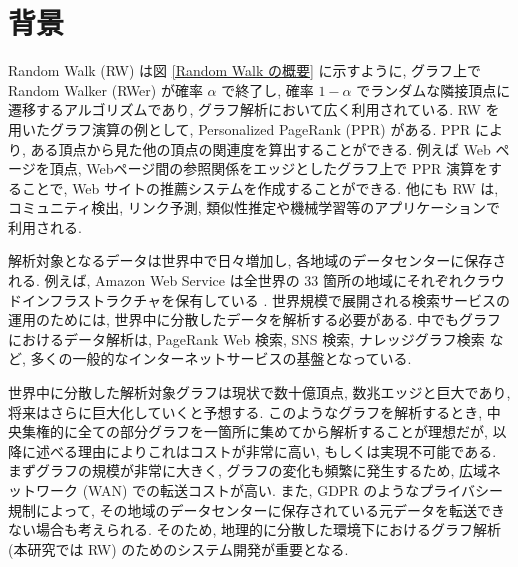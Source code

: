 \section{背景}

Random Walk (RW) は図 \ref{Random Walk の概要} に示すように, グラフ上で Random Walker (RWer) が確率 $\alpha$ で終了し, 確率 $1 - \alpha$ でランダムな隣接頂点に遷移するアルゴリズムであり, グラフ解析において広く利用されている. RW を用いたグラフ演算の例として, Personalized PageRank \cite{PPR} (PPR) がある. PPR により, ある頂点から見た他の頂点の関連度を算出することができる. 例えば Web ページを頂点, Webページ間の参照関係をエッジとしたグラフ上で PPR 演算をすることで, Web サイトの推薦システムを作成することができる. 他にも RW は, コミュニティ検出, リンク予測, 類似性推定や機械学習等のアプリケーションで利用される. 


解析対象となるデータは世界中で日々増加し, 各地域のデータセンターに保存される. 例えば, Amazon Web Service は全世界の 33 箇所の地域にそれぞれクラウドインフラストラクチャを保有している \cite{aws} . 世界規模で展開される検索サービスの運用のためには, 世界中に分散したデータを解析する必要がある. 中でもグラフにおけるデータ解析は, PageRank Web 検索\cite{334}, SNS 検索\cite{10.5555/2535461.2535468}, ナレッジグラフ検索\cite{10.1145/3331184.3331252} など, 多くの一般的なインターネットサービスの基盤となっている.  

世界中に分散した解析対象グラフは現状で数十億頂点, 数兆エッジと巨大であり, 将来はさらに巨大化していくと予想する. このようなグラフを解析するとき, 中央集権的に全ての部分グラフを一箇所に集めてから解析することが理想だが, 以降に述べる理由によりこれはコストが非常に高い, もしくは実現不可能である. まずグラフの規模が非常に大きく, グラフの変化も頻繁に発生するため, 広域ネットワーク (WAN) での転送コストが高い. また, GDPR のようなプライバシー規制によって, その地域のデータセンターに保存されている元データを転送できない場合も考えられる. そのため, 地理的に分散した環境下におけるグラフ解析 (本研究では RW) のためのシステム開発が重要となる. 

